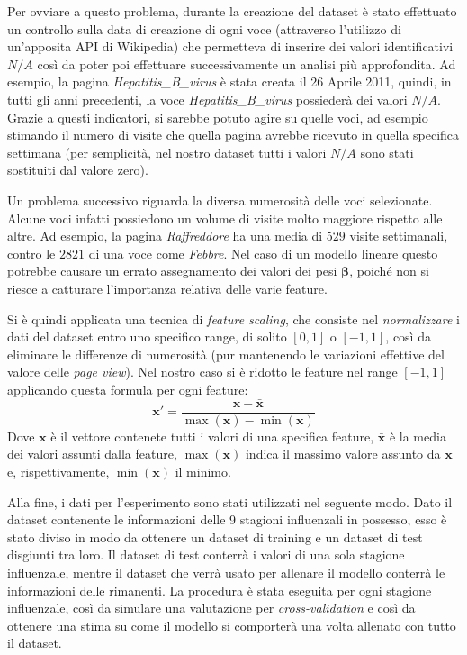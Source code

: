 Per ovviare a questo problema, durante la creazione del dataset è stato effettuato un controllo sulla data di creazione di 
ogni voce (attraverso l'utilizzo di un'apposita API di Wikipedia) che permetteva di inserire dei valori identificativi $N/A
$ così da poter poi effettuare successivamente un analisi più approfondita. Ad esempio, la pagina \textit{Hepatitis_B_virus} 
è stata creata il 26 Aprile 2011, quindi, in tutti gli anni precedenti, la voce \textit{Hepatitis_B_virus} 
possiederà dei valori $N/A$. Grazie a questi indicatori, si sarebbe potuto agire su quelle voci, ad esempio 
stimando il numero di visite che quella pagina avrebbe ricevuto in quella specifica settimana (per semplicità, nel nostro 
dataset tutti i valori $N/A$ sono stati sostituiti dal valore zero).
\bigskip

Un problema successivo riguarda la diversa numerosità delle voci selezionate. Alcune voci infatti 
possiedono un volume di visite molto maggiore rispetto alle altre. Ad esempio, la pagina \textit{Raffreddore} ha una media di 
$529$ visite settimanali, contro le $2821$ di una voce come \textit{Febbre}. Nel caso di un modello lineare questo potrebbe 
causare un errato assegnamento dei valori dei pesi $\bm{\beta}$, poiché non si riesce a catturare l'importanza relativa delle 
varie feature.
\bigskip

Si è quindi applicata una tecnica di \textit{feature scaling}, che consiste nel \textit{normalizzare} i dati 
del dataset entro uno specifico range, di solito $[0, 1]$ o $[-1, 1]$, così da eliminare le differenze di numerosità (pur 
mantenendo le variazioni effettive del valore delle \textit{page view}). Nel nostro caso si è ridotto le feature nel range 
$[-1, 1]$ applicando questa formula per ogni feature:
\begin{equation}
\bm{x}' = \frac{\bm{x}-\bar{\bm{x}}}{\max(\bm{x})-\min(\bm{x})}
\end{equation} 
Dove $\bm{x}$ è il vettore contenete tutti i valori di una specifica feature, $\bar{\bm{x}}$ è la media dei valori assunti 
dalla feature, $\max(\bm{x})$ indica il massimo valore assunto da $\bm{x}$ e, rispettivamente, $\min(\bm{x})$ il minimo.
\bigskip

Alla fine, i dati per l'esperimento sono stati utilizzati nel seguente modo. Dato il dataset contenente le informazioni 
delle 9 stagioni influenzali in possesso, esso è stato diviso in modo da ottenere un dataset di training e un dataset 
di test disgiunti tra loro. Il dataset di test conterrà i valori di una sola stagione influenzale, mentre il dataset che 
verrà usato per allenare il modello conterrà le informazioni delle rimanenti. La procedura è stata eseguita 
per ogni stagione influenzale, così da simulare una valutazione per \textit{cross-validation} e così da ottenere una stima su 
come il modello si comporterà una volta allenato con tutto il dataset.
\bigskip
\newpage
